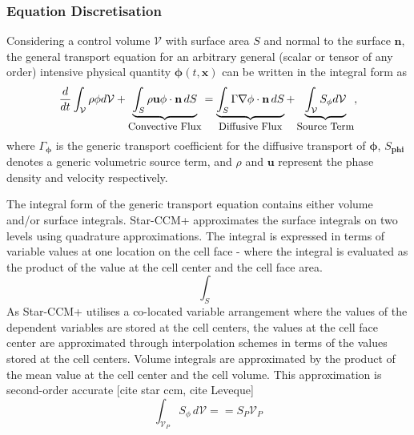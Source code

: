 \subsubsection{Equation Discretisation}
Considering a control volume $\mathcal{V}$ with surface area $S$ and normal to the surface $\mathbf{n}$, the general transport equation for an arbitrary general (scalar or tensor of any order) intensive
physical quantity $\mathbf{\phi}(t, \mathbf{x})$ can be written in the integral form as
\begin{equation}\label{eqn_genTransport}
    \frac{d}{dt}\int_{\mathcal{V}} \rho \mathbf{\phi} d\mathcal{V}
    + \underbrace{\int_{S} \rho \mathbf{u} \mathbf{\phi} \cdot \mathbf{n}\,dS}_{\text{\small Convective Flux}}
    = \underbrace{\int_{S}\Gamma\nabla \mathbf{\phi} \cdot \mathbf{n}\,dS}_{\text{\small Diffusive Flux}} + \underbrace{\int_{\mathcal{V}} S_{\mathbf{\phi}} d\mathcal{V}}_{\text{\small Source Term}},
    \end{equation} %
    where $\Gamma_{\mathbf{\phi}}$ is the generic transport coefficient for the diffusive transport of $\mathbf{\phi}$, $S_{\mathbf{phi}}$
    denotes a generic volumetric source term, and $\rho$ and $\mathbf{u}$ represent the phase density and velocity respectively.     

The integral form of the generic transport equation contains either volume and/or surface integrals. 
Star-CCM+ approximates the surface integrals on two levels using quadrature approximations. The 
integral is expressed in terms of variable values at one location on the cell face - where the integral 
is evaluated as the product of the value at the cell center and the cell face area.
\begin{equation}
    \int_{S}
\end{equation}
As Star-CCM+ utilises a co-located variable arrangement where the 
    values of the dependent variables are stored at the cell centers, the values at the 
    cell face center are approximated through interpolation schemes in terms of the values
    stored at the cell centers. 
Volume integrals are approximated by the product of the mean value at the cell center and the
    cell volume. This approximation is second-order accurate [cite star ccm, cite Leveque]
\begin{equation}\label{eqn_volumeDisc}
    \int_{\mathcal{V}_{P}}S_{\phi}\,d\mathcal{V} == S_{P}\mathcal{V}_{P}
\end{equation}    



